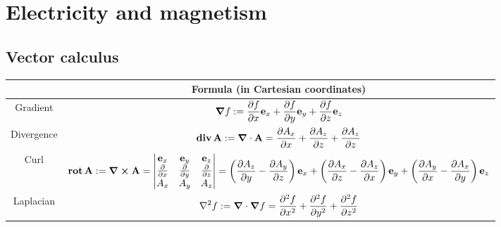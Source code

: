 \documentclass[../../../main.tex]{subfiles}
\begin{document}
\section{Electricity and magnetism}
\subsection{Vector calculus}
\begin{center}
    \begin{tabular}{|c|c|}

        \hline
                   & Formula (in Cartesian coordinates)                                                                                                                                                                                                                                                                                                         \\
        \hline
        Gradient   & $\displaystyle\grad f:=\frac{\partial f}{\partial x}\boldsymbol{\mathrm{e}}_x+\frac{\partial f}{\partial y}\boldsymbol{\mathrm{e}}_y+\frac{\partial f}{\partial z}\boldsymbol{\mathrm{e}}_z$                                                                                                                                                                                                  \\
        \hline
        Divergence & $\displaystyle\operatorname{\boldsymbol{\mathrm{div}}} \boldsymbol{\mathrm{A}}:=\grad\cdot\boldsymbol{\mathrm{A}}=\frac{\partial A_x}{\partial x}+\frac{\partial A_z}{\partial z}+\frac{\partial A_z}{\partial z}$                                                                                                                                                                                               \\
        \hline
        Curl       & $\displaystyle\rot \vf{A}:=\grad\crossprod\vf{A}=\begin{vmatrix}
                \vf{e}_x                    & \vf{e}_y                    & \vf{e}_z                    \\
                \frac{\partial}{\partial x} & \frac{\partial}{\partial y} & \frac{\partial}{\partial z} \\
                A_x                         & A_y                         & A_z                         \\
            \end{vmatrix}=\left(\frac{\partial A_z}{\partial y}-\frac{\partial A_y}{\partial z}\right)\vf{e}_x+\left(\frac{\partial A_x}{\partial z}-\frac{\partial A_z}{\partial x}\right)\vf{e}_y+\left(\frac{\partial A_y}{\partial x}-\frac{\partial A_x}{\partial y}\right)\vf{e}_z$ \\
        \hline
        Laplacian  & $\displaystyle\laplacian f:=\grad\cdot\grad f=\frac{\partial^2f}{\partial x^2}+\frac{\partial^2f}{\partial y^2}+\frac{\partial^2f}{\partial z^2}$                                                                                                                                                                                          \\
        \hline
    \end{tabular}
\end{center}
\end{document}

